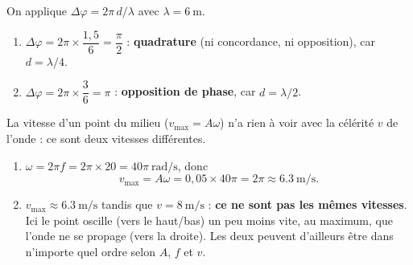 \documentclass[11pt,a4paper]{article}
\begin{document}
\begin{corrige}
On applique $\Delta\varphi=2\pi\,d/\lambda$ avec $\lambda=\SI{6}{\metre}$.
\begin{enumerate}[label=\alph*)]
  \item $\Delta\varphi=2\pi\times\dfrac{1{,}5}{6}=\dfrac{\pi}{2}$ : \textbf{quadrature}
        (ni concordance, ni opposition), car $d=\lambda/4$.
  \item $\Delta\varphi=2\pi\times\dfrac{3}{6}=\pi$ : \textbf{opposition de phase},
        car $d=\lambda/2$.
\end{enumerate}
\end{corrige}

\begin{corrige}
La vitesse d'un point du milieu ($v_{\max}=A\omega$) n'a rien à voir avec la célérité $v$ de
l'onde : ce sont deux vitesses différentes.
\begin{enumerate}[label=\alph*)]
  \item $\omega=2\pi f=2\pi\times 20=40\pi\ \si{\radian\per\second}$, donc
        \[ v_{\max}=A\omega=0{,}05\times 40\pi=2\pi\approx\SI{6.3}{\metre\per\second}. \]
  \item $v_{\max}\approx\SI{6.3}{\metre\per\second}$ tandis que $v=\SI{8}{\metre\per\second}$ :
        \textbf{ce ne sont pas les mêmes vitesses}. Ici le point oscille (vers le haut/bas) un
        peu moins vite, au maximum, que l'onde ne se propage (vers la droite). Les deux
        peuvent d'ailleurs être dans n'importe quel ordre selon $A$, $f$ et $v$.
\end{enumerate}
\end{corrige}
\end{document}
